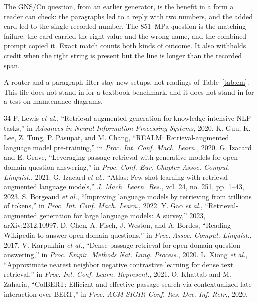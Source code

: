 \documentclass[conference]{IEEEtran}
\begin{document}
The GNS/Cu question, from an earlier generator, is the benefit in a form a reader can check: the paragraphs led to a reply with two numbers, and the added card led to the single recorded number. The 851~MPa question is the matching failure: the card carried the right value and the wrong name, and the combined prompt copied it. Exact match counts both kinds of outcome. It also withholds credit when the right string is present but the line is longer than the recorded span.

A router and a paragraph filter stay new setups, not readings of Table~\ref{tab:em}. This file does not stand in for a textbook benchmark, and it does not stand in for a test on maintenance diagrams.

\begin{thebibliography}{34}
P. Lewis \emph{et al.}, ``Retrieval-augmented generation for knowledge-intensive NLP tasks,'' in \emph{Advances in Neural Information Processing Systems}, 2020.
K. Guu, K. Lee, Z. Tung, P. Pasupat, and M. Chang, ``REALM: Retrieval-augmented language model pre-training,'' in \emph{Proc. Int. Conf. Mach. Learn.}, 2020.
G. Izacard and E. Grave, ``Leveraging passage retrieval with generative models for open domain question answering,'' in \emph{Proc. Conf. Eur. Chapter Assoc. Comput. Linguist.}, 2021.
G. Izacard \emph{et al.}, ``Atlas: Few-shot learning with retrieval augmented language models,'' \emph{J. Mach. Learn. Res.}, vol. 24, no. 251, pp. 1--43, 2023.
S. Borgeaud \emph{et al.}, ``Improving language models by retrieving from trillions of tokens,'' in \emph{Proc. Int. Conf. Mach. Learn.}, 2022.
Y. Gao \emph{et al.}, ``Retrieval-augmented generation for large language models: A survey,'' 2023, arXiv:2312.10997.
D. Chen, A. Fisch, J. Weston, and A. Bordes, ``Reading Wikipedia to answer open-domain questions,'' in \emph{Proc. Assoc. Comput. Linguist.}, 2017.
V. Karpukhin \emph{et al.}, ``Dense passage retrieval for open-domain question answering,'' in \emph{Proc. Empir. Methods Nat. Lang. Process.}, 2020.
L. Xiong \emph{et al.}, ``Approximate nearest neighbor negative contrastive learning for dense text retrieval,'' in \emph{Proc. Int. Conf. Learn. Represent.}, 2021.
O. Khattab and M. Zaharia, ``ColBERT: Efficient and effective passage search via contextualized late interaction over BERT,'' in \emph{Proc. ACM SIGIR Conf. Res. Dev. Inf. Retr.}, 2020.

\end{thebibliography}
\end{document}
